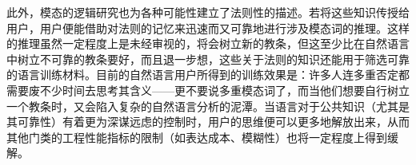 \documentclass[fontset=ubuntu]{ctexart}
\begin{document}
			此外，模态的逻辑研究也为各种可能性建立了法则性的描述。若将这些知识传授给用户，用户便能借助对法则的记忆来迅速而又可靠地进行涉及模态词的推理。这样的推理虽然一定程度上是未经审视的，将会树立新的教条，但这至少比在自然语言中树立不可靠的教条要好，而且退一步想，这些关于法则的知识还能用于筛选可靠的语言训练材料。目前的自然语言用户所得到的训练效果是：许多人连多重否定都需要废不少时间去思考其含义——更不要说多重模态词了，而当他们想要自行树立一个教条时，又会陷入复杂的自然语言分析的泥潭。当语言对于公共知识（尤其是其可靠性）有着更为深谋远虑的控制时，用户的思维便可以更多地解放出来，从而其他门类的工程性能指标的限制（如表达成本、模糊性）也将一定程度上得到缓解。
			
	\nocite{*}
	
\end{document}
